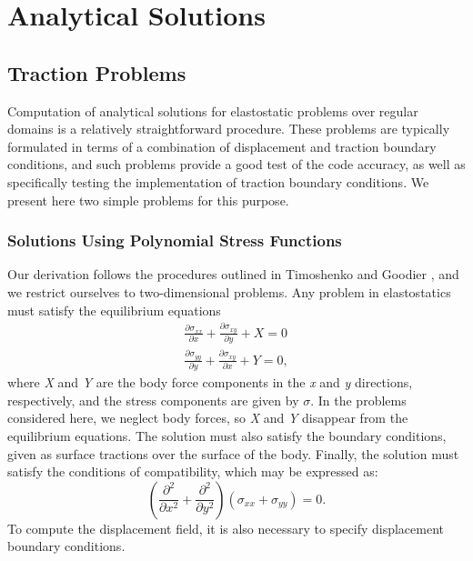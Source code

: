 
\chapter{\label{cha:Analytical-Solns}Analytical Solutions}


\section{\label{sec:TractionProblems}Traction Problems}

Computation of analytical solutions for elastostatic problems over
regular domains is a relatively straightforward procedure. These problems
are typically formulated in terms of a combination of displacement
and traction boundary conditions, and such problems provide a good
test of the code accuracy, as well as specifically testing the implementation
of traction boundary conditions. We present here two simple problems
for this purpose.


\subsection{Solutions Using Polynomial Stress Functions}

Our derivation follows the procedures outlined in Timoshenko and Goodier
\cite{Timoshenko:Goodier:1987}, and we restrict ourselves to two-dimensional
problems. Any problem in elastostatics must satisfy the equilibrium
equations
\begin{gather}
\frac{\partial\sigma_{xx}}{\partial x}+\frac{\partial\sigma_{xy}}{\partial y}+X=0\label{eq:1}\\
\frac{\partial\sigma_{yy}}{\partial y}+\frac{\partial\sigma_{xy}}{\partial x}+Y=0,\nonumber 
\end{gather}
where \textit{X} and \textit{Y} are the body force components in the
\textit{x} and \textit{y} directions, respectively, and the stress
components are given by $\sigma$. In the problems considered here,
we neglect body forces, so \textit{X} and \textit{Y} disappear from
the equilibrium equations. The solution must also satisfy the boundary
conditions, given as surface tractions over the surface of the body.
Finally, the solution must satisfy the conditions of compatibility,
which may be expressed as:
\begin{equation}
\left(\frac{\partial^{2}}{\partial x^{2}}+\frac{\partial^{2}}{\partial y^{2}}\right)\left(\sigma_{xx}+\sigma_{yy}\right)=0.\label{eq:2}
\end{equation}
To compute the displacement field, it is also necessary to specify
displacement boundary conditions.

